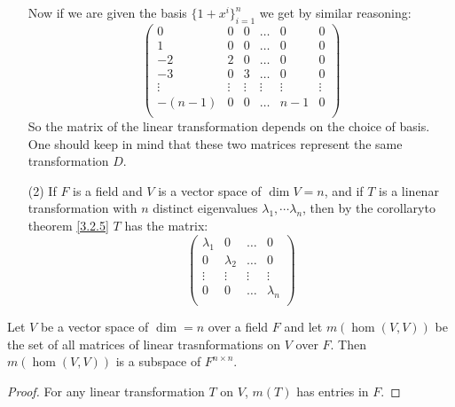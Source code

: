 \begin{example}
\begin{enumerate}
            Now if we are given the basis $\{1+x^i\}_{i=1}^n$ we get by similar
            reasoning:
                \begin{equation*}
                    \begin{pmatrix} 
                        0   &   0   &   0   & \dots &   0   &   0   \\
                        1   &   0   &   0   & \dots &   0   &   0   \\
                        -2  &   2   &   0   & \dots &   0   &   0   \\
                        -3  &   0   &   3   & \dots &   0   &   0   \\
                        \vdots & \vdots & \vdots & \vdots & \vdots & \vdots \\
                        -(n-1)   &   0   &   0   & \dots &   n-1   &   0   \\
                    \end{pmatrix}
                \end{equation*}
            So the matrix of the linear transformation depends on the choice of
            basis. One should keep in mind that these two matrices represent the
            same transformation $D$.

        \item[(2)] If $F$ is a field and  $V$ is a vector space of  $\dim{V}=n$,
            and if $T$ is a linenar transformation with  $n$ distinct
            eigenvalues  $\lambda_1, \dotsm \lambda_n$, then by the corollaryto
            theorem \ref{3.2.5} $T$ has the matrix:
                \begin{equation}
                    \begin{pmatrix} 
                        \lambda_1   &   0   & \dots  &   0   \\
                        0     &   \lambda_2   & \dots  &   0   \\
                        \vdots & \vdots & \vdots & \vdots \\
                        0     &  0   & \dots  &   \lambda_n   \\
                    \end{pmatrix}
                \end{equation} 
    \end{enumerate}
\end{example} 

\begin{lemma}\label{3.3.1}
    Let $V$ be a vector space of $\dim=n$ over a field  $F$ and let
    $m(\hom{(V,V)})$ be the set of all matrices of linear trasnformations on $V$ 
    over $F$. Then  $m(\hom{(V,V)})$ is a subspace of $F^{n \times n}$.
\end{lemma}
\begin{proof}
    For any linear transformation $T$ on  $V$,  $m(T)$ has entries in $F$.
\end{proof}

